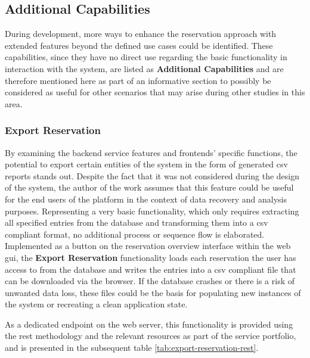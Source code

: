 \subsection{Additional Capabilities}
\label{ch:Implementation:sec:Reservation System:ssec:Additional Capabilities}

During development, more ways to enhance the reservation approach with extended features beyond the defined use cases could be identified.
These capabilities, since they have no direct use regarding the basic functionality in interaction with the system, are listed as \textbf{Additional Capabilities} and are therefore mentioned here as part of an informative section to possibly be considered as useful for other scenarios that may arise during other studies in this area.

\subsubsection{Export Reservation}
\label{ch:Implementation:sec:Reservation System:ssec:Additional Capabilities:sssec:Export Reservation}

By examining the backend service features and frontends' specific functions, the potential to export certain entities of the system in the form of generated \acrshort{csv} reports stands out.
Despite the fact that it was not considered during the design of the system, the author of the work assumes that this feature could be useful for the end users of the platform in the context of data recovery and analysis purposes.
Representing a very basic functionality, which only requires extracting all specified entries from the database and transforming them into a \acrshort{csv} compliant format, no additional process or sequence flow is elaborated.
Implemented as a button on the reservation overview interface within the web \acrshort{gui}, the \textbf{Export Reservation} functionality loads each reservation the user has access to from the database and writes the entries into a \acrshort{csv} compliant file that can be downloaded via the browser.
If the database crashes or there is a risk of unwanted data loss, these files could be the basis for populating new instances of the system or recreating a clean application state.

\noindent As a dedicated endpoint on the web server, this functionality is provided using the \acrshort{rest} methodology and the relevant resources as part of the service portfolio, and is presented in the subsequent table \ref{tab:export-reservation-rest}.

